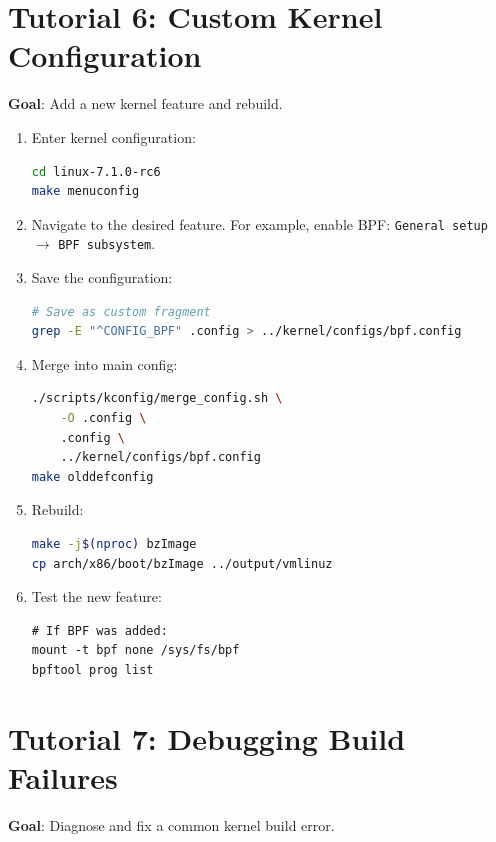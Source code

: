 \section{Tutorial 6: Custom Kernel Configuration}

\textbf{Goal}: Add a new kernel feature and rebuild.

\begin{enumerate}[nosep]
  \item Enter kernel configuration:
\begin{lstlisting}[language=bash]
cd linux-7.1.0-rc6
make menuconfig
\end{lstlisting}
  \item Navigate to the desired feature. For example, enable BPF:
        \texttt{General setup} $\rightarrow$ \texttt{BPF subsystem}.
  \item Save the configuration:
\begin{lstlisting}[language=bash]
# Save as custom fragment
grep -E "^CONFIG_BPF" .config > ../kernel/configs/bpf.config
\end{lstlisting}
  \item Merge into main config:
\begin{lstlisting}[language=bash]
./scripts/kconfig/merge_config.sh \
    -O .config \
    .config \
    ../kernel/configs/bpf.config
make olddefconfig
\end{lstlisting}
  \item Rebuild:
\begin{lstlisting}[language=bash]
make -j$(nproc) bzImage
cp arch/x86/boot/bzImage ../output/vmlinuz
\end{lstlisting}
  \item Test the new feature:
\begin{lstlisting}
# If BPF was added:
mount -t bpf none /sys/fs/bpf
bpftool prog list
\end{lstlisting}
\end{enumerate}

\section{Tutorial 7: Debugging Build Failures}

\textbf{Goal}: Diagnose and fix a common kernel build error.

